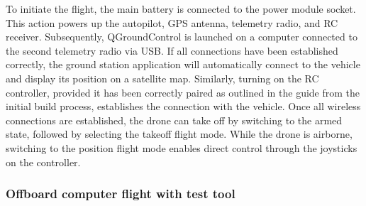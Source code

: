 To initiate the flight, the main battery is connected to the power module socket. This action powers up the autopilot, GPS antenna, telemetry radio, and RC receiver. Subsequently, QGroundControl is launched on a computer connected to the second telemetry radio via USB. If all connections have been established correctly, the ground station application will automatically connect to the vehicle and display its position on a satellite map. Similarly, turning on the RC controller, provided it has been correctly paired as outlined in the guide from the initial build process, establishes the connection with the vehicle. Once all wireless connections are established, the drone can take off by switching to the armed state, followed by selecting the takeoff flight mode. While the drone is airborne, switching to the position flight mode enables direct control through the joysticks on the controller.


\subsubsection{Offboard computer flight with test tool}
\label{subsec:fl-test-2}

